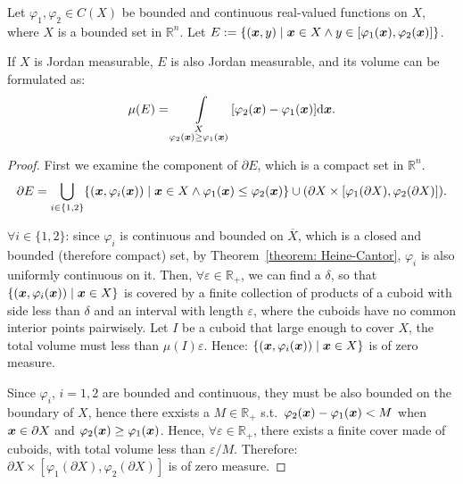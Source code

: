 \documentclass[openany]{book}
\begin{document}
\begin{theorem}
	Let $\varphi_1, \varphi_2 \in C(X)$ be bounded and continuous real-valued functions on $X$, where $X$ is a bounded set in $\mathbb R^n$. 
	Let $E := \{ (\boldsymbol{x}, y) \mid \boldsymbol{x} \in X \wedge y \in [\varphi_1(\boldsymbol{x}), \varphi_2(\boldsymbol{x})] \}$.

	If $X$ is Jordan measurable, $E$ is also Jordan measurable, and its volume can be formulated as:
	\begin{equation*}
		\mu(E) = \int\limits_{\substack{X \\ \varphi_2(\boldsymbol{x}) \geq \varphi_1(\boldsymbol{x})}} [\varphi_2(\boldsymbol{x}) - \varphi_1(\boldsymbol{x})] \mathrm{d} \boldsymbol{x} .
	\end{equation*}
\end{theorem}
\begin{proof}
	First we examine the component of $\partial E$, which is a compact set in $\mathbb R^n$.  
	\begin{equation*}
		\partial E = \bigcup_{i \in \{1, 2\}}\{(\boldsymbol{x}, \varphi_i(\boldsymbol{x})) \mid \boldsymbol{x} \in X \wedge \varphi_1(\boldsymbol{x}) \leq \varphi_2(\boldsymbol{x})\}
		\cup (\partial X \times [\varphi_1(\partial X), \varphi_2(\partial X)]).
	\end{equation*}

	$\forall i \in \{1, 2\}$: since $\varphi_i$ is continuous and bounded on $\overline X$, which is a closed and bounded (therefore compact) set, by Theorem~\ref{theorem: Heine-Cantor}, $\varphi_i$ is also uniformly continuous on it. 
	Then, $\forall \varepsilon \in \mathbb R_+$, we can find a $\delta$, so that $\{(\boldsymbol{x}, \varphi_i(\boldsymbol{x})) \mid \boldsymbol{x} \in X\}$ is covered by a finite collection of products of a cuboid with side less than $\delta$ and an interval with length $\varepsilon$, where the cuboids have no common interior points pairwisely. 
	Let $I$ be a cuboid that large enough to cover $X$, the total volume must less than $\mu(I) \varepsilon$.
	Hence: $\{(\boldsymbol{x}, \varphi_i(\boldsymbol{x})) \mid \boldsymbol{x} \in X\}$ is of zero measure.
	
	Since $\varphi_i$, $i = 1, 2$ are bounded and continuous, they must be also bounded on the boundary of $X$, hence there exxists a $M \in \mathbb R_+$ s.t.\ $\varphi_2(\boldsymbol{x}) - \varphi_1(\boldsymbol{x}) < M$ when $\boldsymbol{x} \in \partial X$ and $\varphi_2(\boldsymbol{x}) \geq \varphi_1(\boldsymbol{x})$. 
	Hence, $\forall \varepsilon \in \mathbb R_+$, there exists a finite cover made of cuboids, with total volume less than $\varepsilon / M$. 
	Therefore: $\partial X \times [\varphi_1(\partial X), \varphi_2(\partial X)]$ is of zero measure.
\end{proof}
\end{document}
